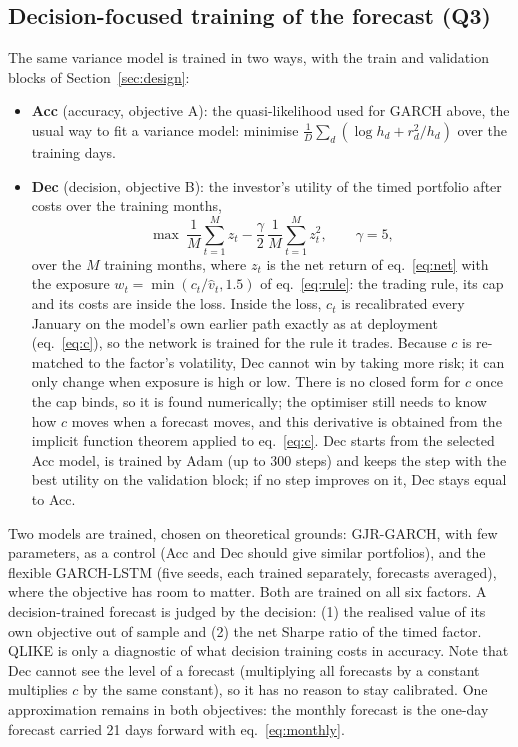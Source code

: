 \documentclass[12pt]{article}
\begin{document}
\FloatBarrier
\subsection{Decision-focused training of the forecast (Q3)}\label{sec:dec}
The same variance model is trained in two ways, with the train and validation blocks of Section~\ref{sec:design}:
\begin{itemize}
\item \textbf{Acc} (accuracy, objective A): the quasi-likelihood used for GARCH above, the usual way to fit a variance model: minimise $\frac1D\sum_d(\log h_d+r_d^2/h_d)$ over the training days.
\item \textbf{Dec} (decision, objective B): the investor's utility of the timed portfolio after costs over the training months,
\begin{equation}\label{eq:utility}
\max\ \frac1M\sum_{t=1}^{M} z_t-\frac{\gamma}{2}\,\frac1M\sum_{t=1}^{M} z_t^2,\qquad\gamma=5,
\end{equation}
over the $M$ training months, where $z_t$ is the net return of eq.~\eqref{eq:net} with the exposure $w_t=\min(c_t/\hat v_t,1.5)$ of eq.~\eqref{eq:rule}: the trading rule, its cap and its costs are inside the loss. Inside the loss, $c_t$ is recalibrated every January on the model's own earlier path exactly as at deployment (eq.~\eqref{eq:c}), so the network is trained for the rule it trades. Because $c$ is re-matched to the factor's volatility, Dec cannot win by taking more risk; it can only change when exposure is high or low. There is no closed form for $c$ once the cap binds, so it is found numerically; the optimiser still needs to know how $c$ moves when a forecast moves, and this derivative is obtained from the implicit function theorem applied to eq.~\eqref{eq:c}. Dec starts from the selected Acc model, is trained by Adam (up to 300 steps) and keeps the step with the best utility on the validation block; if no step improves on it, Dec stays equal to Acc.
\end{itemize}
Two models are trained, chosen on theoretical grounds: GJR-GARCH, with few parameters, as a control (Acc and Dec should give similar portfolios), and the flexible GARCH-LSTM (five seeds, each trained separately, forecasts averaged), where the objective has room to matter. Both are trained on all six factors. A decision-trained forecast is judged by the decision: (1) the realised value of its own objective out of sample and (2) the net Sharpe ratio of the timed factor. QLIKE is only a diagnostic of what decision training costs in accuracy. Note that Dec cannot see the level of a forecast (multiplying all forecasts by a constant multiplies $c$ by the same constant), so it has no reason to stay calibrated. One approximation remains in both objectives: the monthly forecast is the one-day forecast carried 21 days forward with eq.~\eqref{eq:monthly}.
\end{document}
